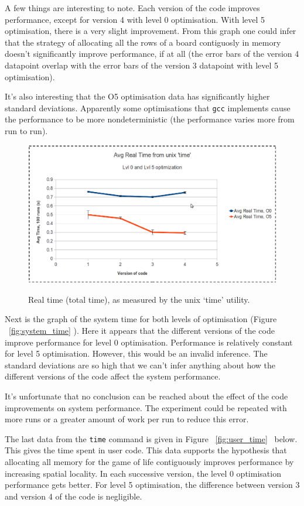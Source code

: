 \documentclass{article}
\begin{document}
A few things are interesting to note. Each version of the code improves performance, except for version 4 with level 0 optimisation. With level 5 optimisation, there is a very slight improvement. From this graph one could infer that the strategy of allocating all the rows of a board contiguosly in memory doesn't significantly improve performance, if at all (the error bars of the version 4 datapoint overlap with the error bars of the version 3 datapoint with level 5 optimisation). 

It's also interesting that the O5 optimisation data has significantly higher standard deviations. Apparently some optimisations that \verb=gcc= implements cause the performance to be more nondeterministic (the performance varies more from run to run).   
 
\begin{figure}[H] 
\centering
\caption{Real time (total time), as measured by the unix `time' utility.}
\includegraphics[scale=.45]{real_time.png}
\label{fig:real_time}
\end{figure}

Next is the graph of the system time for both levels of optimisation (Figure ~\ref{fig:system_time} ). Here it appears that the different versions of the code improve performance for level 0 optimisation. Performance is relatively constant for level 5 optimisation. However, this would be an invalid inference. The standard deviations are so high that we can't infer anything about how the different versions of the code affect the system performance. 

It's unfortunate that no conclusion can be reached about the effect of the code improvements on system performance. The experiment could be repeated with more runs or a greater amount of work per run to reduce this error. 

The last data from the \verb=time= command is given in Figure ~\ref{fig:user_time} \ below. This gives the time spent in user code. This data supports the hypothesis that allocating all memory for the game of life contiguously improves performance by increasing spatial locality. In each successive version, the level 0 optimisation performance gets better. For level 5 optimisation, the difference between version 3 and version 4 of the code is negligible. 
\end{document}
